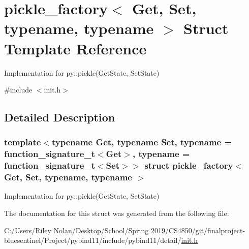 \hypertarget{structpickle__factory}{}\section{pickle\+\_\+factory$<$ Get, Set, typename, typename $>$ Struct Template Reference}
\label{structpickle__factory}


Implementation for py\+::pickle(\+Get\+State, Set\+State)  




{\ttfamily \#include $<$init.\+h$>$}



\subsection{Detailed Description}
\subsubsection*{template$<$typename Get, typename Set, typename = function\+\_\+signature\+\_\+t$<$\+Get$>$, typename = function\+\_\+signature\+\_\+t$<$\+Set$>$$>$\newline
struct pickle\+\_\+factory$<$ Get, Set, typename, typename $>$}

Implementation for py\+::pickle(\+Get\+State, Set\+State) 

The documentation for this struct was generated from the following file\+:\begin{DoxyCompactItemize}
\item 
C\+:/\+Users/\+Riley Nolan/\+Desktop/\+School/\+Spring 2019/\+C\+S4850/git/finalproject-\/bluesentinel/\+Project/pybind11/include/pybind11/detail/\mbox{\hyperlink{init_8h}{init.\+h}}\end{DoxyCompactItemize}
